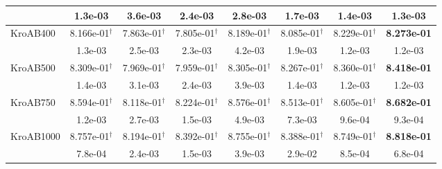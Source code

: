 {\begin{longtable}[c]{lccccccc}
                                        & 1.3e-03            & 3.6e-03            & 2.4e-03            & 2.8e-03            & 1.7e-03            & 1.4e-03                        & 1.3e-03            \\
    \midrule
    KroAB400             & 8.166e-01$^{\dag}$ & 7.863e-01$^{\dag}$ & 7.805e-01$^{\dag}$ & 8.189e-01$^{\dag}$ & 8.085e-01$^{\dag}$ & 8.229e-01$^{\dag}$  & \textbf{8.273e-01} \\
                                                & 1.3e-03            & 2.5e-03            & 2.3e-03            & 4.2e-03            & 1.9e-03            & 1.2e-03                         & 1.2e-03            \\
    \midrule
    KroAB500             & 8.309e-01$^{\dag}$ & 7.969e-01$^{\dag}$ & 7.959e-01$^{\dag}$ & 8.305e-01$^{\dag}$ & 8.267e-01$^{\dag}$ & 8.360e-01$^{\dag}$  & \textbf{8.418e-01} \\
                                            & 1.4e-03            & 3.1e-03            & 2.4e-03            & 3.9e-03            & 1.4e-03            & 1.2e-03                       & 1.2e-03            \\
    \midrule
    KroAB750          & 8.594e-01$^{\dag}$ & 8.118e-01$^{\dag}$ & 8.224e-01$^{\dag}$ & 8.576e-01$^{\dag}$ & 8.513e-01$^{\dag}$ & 8.605e-01$^{\dag}$  & \textbf{8.682e-01} \\
                                            & 1.2e-03            & 2.7e-03            & 1.5e-03            & 4.9e-03            & 7.3e-03            & 9.6e-04                       & 9.3e-04            \\
    \midrule
    KroAB1000              & 8.757e-01$^{\dag}$ & 8.194e-01$^{\dag}$ & 8.392e-01$^{\dag}$ & 8.755e-01$^{\dag}$ & 8.388e-01$^{\dag}$ & 8.749e-01$^{\dag}$  & \textbf{8.818e-01} \\
                                            & 7.8e-04            & 2.4e-03            & 1.5e-03            & 3.9e-03            & 2.9e-02            & 8.5e-04                      & 6.8e-04            \\
    \midrule


\end{longtable}}
